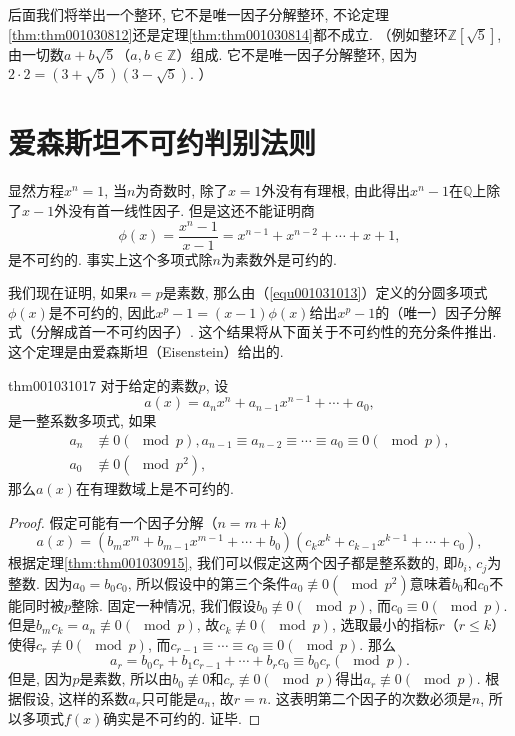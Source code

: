 后面我们将举出一个整环, 它不是唯一因子分解整环, 不论定理\ref{thm:thm001030812}还是定理\ref{thm:thm001030814}都不成立. （例如整环$\mathbb{Z}[\sqrt{5}]$, 由一切数$a+b\sqrt{5}$（$a,b \in \mathbb{Z}$）组成. 它不是唯一因子分解整环, 因为$2 \cdot 2 = (3+\sqrt{5})(3-\sqrt{5})$. ）



\section{爱森斯坦不可约判别法则}\label{section0010310}
显然方程$x^n=1$, 当$n$为奇数时, 除了$x=1$外没有有理根, 由此得出$x^n-1$在$\mathbb{Q}$上除了$x-1$外没有首一线性因子. 但是这还不能证明商
\begin{equation}\label{equ001031013}
\phi(x)=\frac{x^n-1}{x-1}=x^{n-1}+x^{n-2}+\cdots +x+1,
\end{equation}
是不可约的. 事实上这个多项式除$n$为素数外是可约的. 

我们现在证明, 如果$n=p$是素数, 那么由（\ref{equ001031013}）定义的分圆多项式$\phi(x)$是不可约的, 因此$x^p-1=(x-1)\phi(x)$给出$x^p-1$的（唯一）因子分解式（分解成首一不可约因子）. 这个结果将从下面关于不可约性的充分条件推出. 这个定理是由爱森斯坦（Eisenstein）给出的. 
\begin{theorem}{}{thm001031017}
对于给定的素数$p$, 设
\[
a(x)=a_nx^n+a_{n-1}x^{n-1}+\cdots+a_0,
\]
是一整系数多项式, 如果
\[
\begin{aligned}
a_n &\not\equiv 0(\mod{p}),a_{n-1}\equiv a_{n-2}\equiv \cdots \equiv a_0 \equiv 0(\mod{p}),\\
a_0 &\not\equiv 0(\mod{p^2}),
\end{aligned}
\]
那么$a(x)$在有理数域上是不可约的. 
\end{theorem}

\begin{proof}
假定可能有一个因子分解（$n=m+k$）
\[
a(x)=(b_mx^m+b_{m-1}x^{m-1}+\cdots + b_0)(c_kx^k+c_{k-1}x^{k-1} + \cdots + c_0),
\]
根据定理\ref{thm:thm001030915}, 我们可以假定这两个因子都是整系数的, 即$b_i$, $c_j$为整数. 因为$a_0=b_0c_0$, 所以假设中的第三个条件$a_0 \not\equiv 0 (\mod{p^2})$意味着$b_0$和$c_0$不能同时被$p$整除. 固定一种情况, 我们假设$b_0 \not\equiv 0(\mod{p})$, 而$c_0 \equiv 0(\mod{p})$. 但是$b_mc_k = a_n \not\equiv 0(\mod{p})$, 故$c_k \not\equiv 0(\mod{p})$, 选取最小的指标$r$（$r \le k$）使得$c_r \not\equiv 0(\mod{p})$, 而$c_{r-1}\equiv\cdots\equiv c_0 \equiv 0(\mod{p})$. 那么
\[
a_r = b_0c_r + b_1c_{r-1} + \cdots + b_rc_0 \equiv b_0c_r(\mod{p}).
\]
但是, 因为$p$是素数, 所以由$b_0 \not\equiv 0$和$c_r \not\equiv 0(\mod{p})$得出$a_r \not\equiv 0(\mod{p})$. 根据假设, 这样的系数$a_r$只可能是$a_n$, 故$r=n$. 这表明第二个因子的次数必须是$n$, 所以多项式$f(x)$确实是不可约的. 证毕. 
\end{proof}

